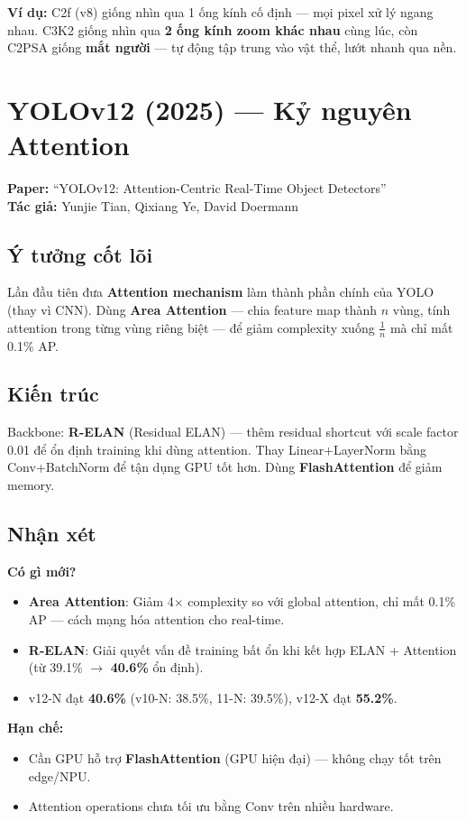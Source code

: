 \documentclass[12pt,a4paper]{report}
\begin{document}
\textbf{Ví dụ:} C2f (v8) giống nhìn qua 1 ống kính cố định --- mọi pixel xử lý ngang nhau. C3K2 giống nhìn qua \textbf{2 ống kính zoom khác nhau} cùng lúc, còn C2PSA giống \textbf{mắt người} --- tự động tập trung vào vật thể, lướt nhanh qua nền.

\section{YOLOv12 (2025) --- Kỷ nguyên Attention}
\textbf{Paper:} ``YOLOv12: Attention-Centric Real-Time Object Detectors''\\
\textbf{Tác giả:} Yunjie Tian, Qixiang Ye, David Doermann

\subsection{Ý tưởng cốt lõi}
Lần đầu tiên đưa \textbf{Attention mechanism} làm thành phần chính của YOLO (thay vì CNN). Dùng \textbf{Area Attention} --- chia feature map thành $n$ vùng, tính attention trong từng vùng riêng biệt --- để giảm complexity xuống $\frac{1}{n}$ mà chỉ mất 0.1\% AP.

\subsection{Kiến trúc}
Backbone: \textbf{R-ELAN} (Residual ELAN) --- thêm residual shortcut với scale factor 0.01 để ổn định training khi dùng attention. Thay Linear+LayerNorm bằng Conv+BatchNorm để tận dụng GPU tốt hơn. Dùng \textbf{FlashAttention} để giảm memory.

\subsection{Nhận xét}

\textbf{Có gì mới?}
\begin{itemize}
    \item \textbf{Area Attention}: Giảm 4$\times$ complexity so với global attention, chỉ mất 0.1\% AP --- cách mạng hóa attention cho real-time.
    \item \textbf{R-ELAN}: Giải quyết vấn đề training bất ổn khi kết hợp ELAN + Attention (từ 39.1\% $\rightarrow$ \textbf{40.6\%} ổn định).
    \item v12-N đạt \textbf{40.6\%} (v10-N: 38.5\%, 11-N: 39.5\%), v12-X đạt \textbf{55.2\%}.
\end{itemize}

\textbf{Hạn chế:}
\begin{itemize}
    \item Cần GPU hỗ trợ \textbf{FlashAttention} (GPU hiện đại) --- không chạy tốt trên edge/NPU.
    \item Attention operations chưa tối ưu bằng Conv trên nhiều hardware.
\end{itemize}
\end{document}
